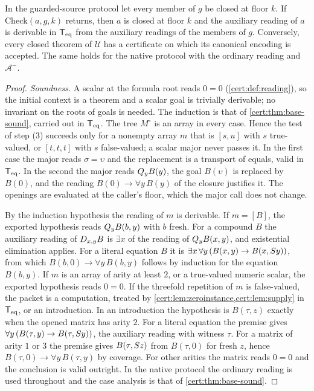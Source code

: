 \begin{proposition}\label{cert:prop:scalar}
In the guarded-source protocol let every member of $g$ be closed at floor
$k$. If $\mathrm{Check}(a,g,k)$ returns, then $a$ is closed at floor $k$ and
the auxiliary reading of $a$ is derivable in $\mathsf{T}_{\mathrm{eq}}$ from the auxiliary
readings of the members of $g$. Conversely, every closed theorem of
$\mathcal U$ has a certificate on which its canonical encoding is accepted.
The same holds for the native protocol with the ordinary reading and
$\mathcal A^{-}$.
\end{proposition}
\begin{proof}
\emph{Soundness.} A scalar at the formula root reads $0=0$
(\cref{cert:def:reading}), so the initial context is a theorem and a scalar
goal is trivially derivable; no invariant on the roots of goals is needed.
The induction is that of \cref{cert:thm:base-sound}, carried out in $\mathsf{T}_{\mathrm{eq}}$.
The tree $M^{\circ}$ is an array in every case. Hence the test of step (3)
succeeds only for a nonempty array $m$ that is $[s,u]$ with $s$ true-valued,
or $[t,t,t]$ with $s$ false-valued; a scalar major never passes it. In the
first case the major reads $\sigma=\upsilon$ and the replacement is a
transport of equals, valid in $\mathsf{T}_{\mathrm{eq}}$. In the second the major reads
$Q_{y}B(y)$, the goal $B(\upsilon)$ is replaced by $B(0)$, and the reading
$B(0)\to\forall y\,B(y)$ of the closure justifies it. The openings are
evaluated at the caller's floor, which the major call does not change.

By the induction hypothesis the reading of $m$ is derivable. If $m=[B]$, the
exported hypothesis reads $Q_{y}B(b,y)$ with $b$ fresh. For a compound $B$
the auxiliary reading of $D_{x,y}B$ is $\exists x$ of the reading of
$Q_{y}B(x,y)$, and existential elimination applies. For a literal equation
$B$ it is $\exists x\,\forall y\,(B(x,y)\to B(x,S y))$, from which
$B(b,0)\to\forall y\,B(b,y)$ follows by induction for the equation $B(b,y)$.
If $m$ is an array of arity at least $2$, or a true-valued numeric scalar, the
exported hypothesis reads $0=0$. If the threefold repetition of $m$ is
false-valued, the packet is a computation, treated by
\cref{cert:lem:zeroinstance,cert:lem:supply} in $\mathsf{T}_{\mathrm{eq}}$, or an introduction.
In an introduction the hypothesis is $B(\tau,z)$ exactly when the opened
matrix has arity $2$. For a literal equation the premise gives
$\forall y\,(B(\tau,y)\to B(\tau,S y))$, the auxiliary reading with witness
$\tau$. For a matrix of arity $1$ or $3$ the premise gives $B(\tau,S z)$
from $B(\tau,0)$ for fresh $z$, hence $B(\tau,0)\to\forall y\,B(\tau,y)$ by
coverage. For other arities the matrix reads $0=0$ and the conclusion is
valid outright. In the native protocol the
ordinary reading is used throughout and the case analysis is that of
\cref{cert:thm:base-sound}.


\end{proof}
